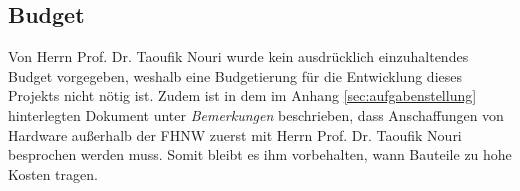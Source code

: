 \subsection{Budget}
Von Herrn Prof. Dr. Taoufik Nouri wurde kein ausdrücklich einzuhaltendes Budget vorgegeben, weshalb eine Budgetierung für die Entwicklung dieses Projekts nicht nötig ist. Zudem ist in dem im Anhang \ref{sec:aufgabenstellung} hinterlegten Dokument unter \textit{Bemerkungen} beschrieben, dass Anschaffungen von Hardware außerhalb der FHNW zuerst mit Herrn Prof. Dr. Taoufik Nouri besprochen werden muss. Somit bleibt es ihm vorbehalten, wann Bauteile zu hohe Kosten tragen.\\

